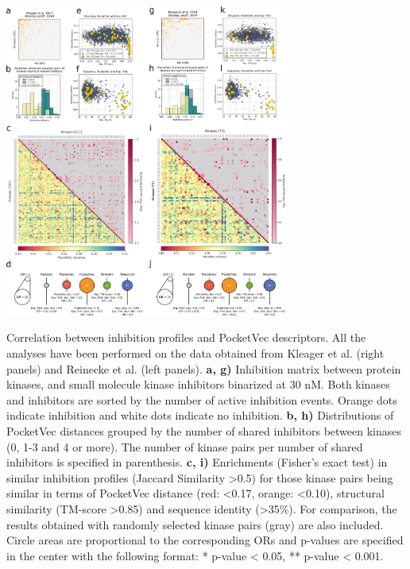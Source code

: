 \makeatletter
\newenvironment{figurehere}
{}
{}
\makeatletter


\begin{figurehere}
 \begin{center}
  \includegraphics[width=0.7\textwidth]{figures/PocketVec/Main/Fig7.png}
  \caption{Correlation between inhibition profiles and PocketVec descriptors. All the analyses have been performed on the data obtained from Kleager et al.\cite{klaeger_target_2017} (right panels) and Reinecke et al.\cite{reinecke_chemical_2023} (left panels).
    \textbf{a, g)} Inhibition matrix between protein kinases, and small molecule kinase inhibitors binarized at 30 nM. Both kinases and inhibitors are sorted by the number of active inhibition events. Orange dots indicate inhibition and white dots indicate no inhibition.
    \textbf{b, h)} Distributions of PocketVec distances grouped by the number of shared inhibitors between kinases (0, 1-3 and 4 or more). The number of kinase pairs per number of shared inhibitors is specified in parenthesis.
    \textbf{c, i)} Enrichments (Fisher’s exact test) in similar inhibition profiles (Jaccard Similarity >0.5) for those kinase pairs being similar in terms of PocketVec distance (red: <0.17, orange: <0.10), structural similarity (TM-score >0.85) and sequence identity (>35\%). For comparison, the results obtained with randomly selected kinase pairs (gray) are also included. Circle areas are proportional to the corresponding ORs and p-values are specified in the center with the following format: * p-value < 0.05, ** p-value < 0.001.
}
\end{center}
\end{figurehere}
